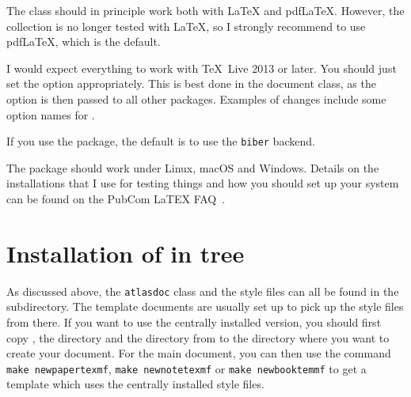 The  class should in principle work both with \LaTeX{} and pdf\LaTeX{}.
However, the collection is no longer tested with \LaTeX,
so I strongly recommend to use pdf\LaTeX, which is the default.

I would expect everything to work with \TeX\ Live 2013 or later.
You should just set the option  appropriately.
This is best done in the document class, as the option is then passed to all other packages.
Examples of changes include some option names for .


 If you use the  package,
the default is to use the \texttt{biber} backend.

The  package should work under Linux, macOS and Windows.
Details on the installations that I use for testing things
and how you should set up your system can be found on the PubCom LaTEX FAQ~\cite{latex-faq}.


\section{Installation of  in  tree}%
\label{sec:texmf}

As discussed above, the \texttt{atlasdoc} class and the style files can all be found in the 
 subdirectory. The template documents are usually set up to pick up the style files from there.
If you want to use the centrally installed version,
you should first copy , the  directory and the  directory from 
 to the directory where you want to create your document.
For the main document, you can then use the command 
\texttt{make newpapertexmf}, \texttt{make newnotetexmf} or \texttt{make newbooktemmf} to get a template which uses the
centrally installed style files.

